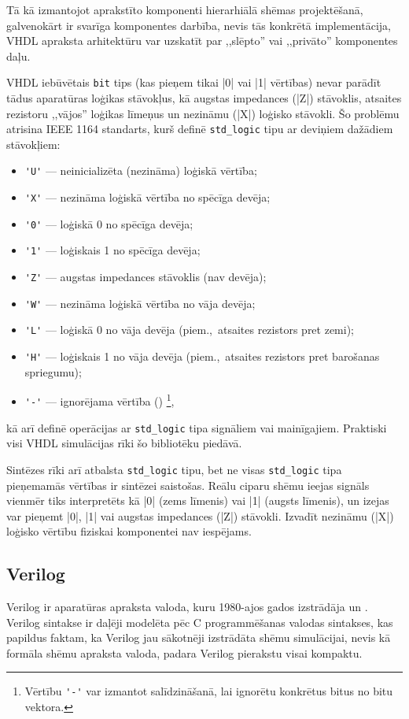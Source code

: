 	Tā kā izmantojot aprakstīto komponenti hierarhiālā shēmas projektēšanā, 
	galvenokārt ir svarīga komponentes darbība, nevis tās konkrētā implementācija,
	VHDL apraksta arhitektūru var uzskatīt par ,,slēpto'' vai ,,privāto''
	komponentes daļu.

	VHDL iebūvētais \texttt{bit} tips (kas pieņem tikai |0| vai |1| vērtības)
	nevar parādīt tādus aparatūras loģikas stāvokļus, kā augstas impedances
	(|Z|) stāvoklis, atsaites rezistoru ,,vājos'' loģikas līmeņus un nezināmu
	(|X|) loģisko stāvokli. Šo problēmu atrisina IEEE 1164 standarts, kurš definē
	\texttt{std\_logic} tipu ar deviņiem dažādiem stāvokļiem:
	\begin{itemize}
		\item \verb|'U'| --- neinicializēta (nezināma) loģiskā vērtība;
		\item \verb|'X'| --- nezināma loģiskā vērtība no spēcīga devēja;
		\item \verb|'0'| --- loģiskā 0 no spēcīga devēja;
		\item \verb|'1'| --- loģiskais 1 no spēcīga devēja;
		\item \verb|'Z'| --- augstas impedances stāvoklis (nav devēja);
		\item \verb|'W'| --- nezināma loģiskā vērtība no vāja devēja;
		\item \verb|'L'| --- loģiskā 0 no vāja devēja (piem.,~atsaites rezistors pret zemi);
		\item \verb|'H'| --- loģiskais 1 no vāja devēja (piem.,~atsaites rezistors pret barošanas spriegumu);
		\item \verb|'-'| --- ignorējama vērtība ()%
			\footnote{Vērtību \verb|'-'| var izmantot salīdzināšanā,
				lai ignorētu konkrētus bitus no bitu vektora.},
	\end{itemize}
	kā arī definē operācijas ar \texttt{std\_logic} tipa signāliem vai mainīgajiem. 
	Praktiski visi VHDL simulācijas rīki šo bibliotēku piedāvā.
	
	Sintēzes rīki arī atbalsta \texttt{std\_logic} tipu, bet ne visas
	\texttt{std\_logic} tipa pieņemamās vērtības ir sintēzei saistošas.
	Reālu ciparu shēmu ieejas signāls vienmēr tiks interpretēts kā |0| (zems līmenis) 
	vai |1| (augsts līmenis), un izejas var pieņemt |0|, |1| vai augstas
	impedances (|Z|) stāvokli. Izvadīt nezināmu (|X|) loģisko vērtību
	fiziskai komponentei nav iespējams.	%

\pagebreak[3]
\subsection{Verilog} \label{sec:verilog}
	Verilog ir aparatūras apraksta valoda, kuru 1980-ajos gados izstrādāja
	 un . Verilog sintakse ir daļēji modelēta
	pēc C programmēšanas valodas sintakses, kas papildus faktam, ka Verilog
	jau sākotnēji izstrādāta shēmu simulācijai, nevis
	kā formāla shēmu apraksta valoda, padara Verilog pierakstu visai kompaktu.

